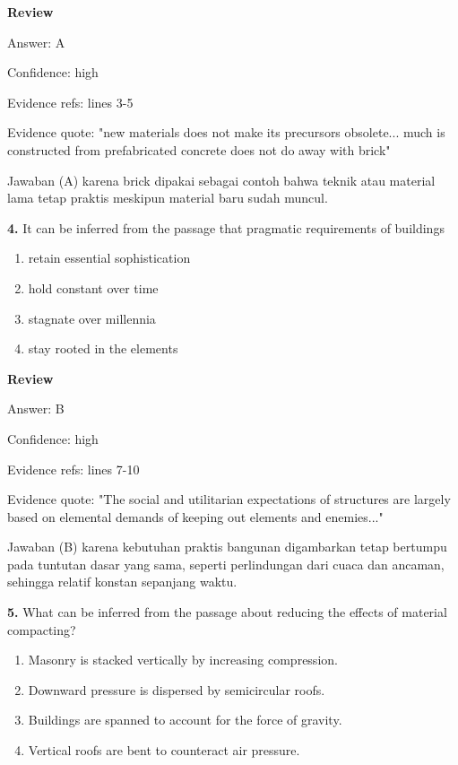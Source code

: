 \documentclass[12pt]{article}
\begin{document}
\par
\begingroup
\setlength{\parskip}{0pt}
\setlength{\parindent}{0pt}
\textbf{Review}\par
Answer: A\par
Confidence: high\par
Evidence refs: lines 3-5\par
Evidence quote: "new materials does not make its precursors obsolete... much is constructed from prefabricated concrete does not do away with brick"\par
Jawaban (A) karena brick dipakai sebagai contoh bahwa teknik atau material lama tetap praktis meskipun material baru sudah muncul.\par
\endgroup
\par
\vspace{0.25\baselineskip}
\noindent\textbf{4.} It can be inferred from the passage that pragmatic requirements of buildings
\begin{enumerate}[label=(\Alph*),leftmargin=*,itemsep=0.2em]
\item retain essential sophistication
\item hold constant over time
\item stagnate over millennia
\item stay rooted in the elements
\end{enumerate}
\par
\begingroup
\setlength{\parskip}{0pt}
\setlength{\parindent}{0pt}
\textbf{Review}\par
Answer: B\par
Confidence: high\par
Evidence refs: lines 7-10\par
Evidence quote: "The social and utilitarian expectations of structures are largely based on elemental demands of keeping out elements and enemies..."\par
Jawaban (B) karena kebutuhan praktis bangunan digambarkan tetap bertumpu pada tuntutan dasar yang sama, seperti perlindungan dari cuaca dan ancaman, sehingga relatif konstan sepanjang waktu.\par
\endgroup
\par
\vspace{0.25\baselineskip}
\noindent\textbf{5.} What can be inferred from the passage about reducing the effects of material compacting?
\begin{enumerate}[label=(\Alph*),leftmargin=*,itemsep=0.2em]
\item Masonry is stacked vertically by increasing compression.
\item Downward pressure is dispersed by semicircular roofs.
\item Buildings are spanned to account for the force of gravity.
\item Vertical roofs are bent to counteract air pressure.
\end{enumerate}
\end{document}
